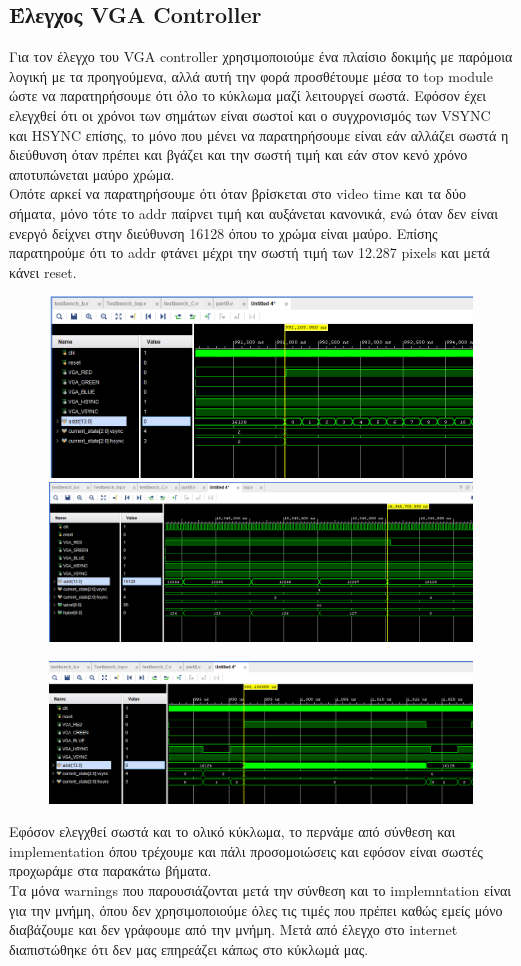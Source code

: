 \documentclass[12pt,a4paper]{article}
\begin{document}
	\subsection{Έλεγχος VGA Controller}
	Για τον έλεγχο του VGA controller χρησιμοποιούμε ένα πλαίσιο δοκιμής με παρόμοια λογική με τα προηγούμενα, αλλά αυτή την φορά προσθέτουμε μέσα το top module ώστε να παρατηρήσουμε ότι όλο το κύκλωμα μαζί λειτουργεί σωστά. Εφόσον έχει ελεγχθεί ότι οι χρόνοι των σημάτων είναι σωστοί και ο συγχρονισμός των VSYNC και HSYNC επίσης, το μόνο που μένει να παρατηρήσουμε είναι εάν αλλάζει σωστά η διεύθυνση όταν πρέπει και βγάζει και την σωστή τιμή και εάν στον κενό χρόνο αποτυπώνεται μαύρο χρώμα.\\
	Οπότε αρκεί να παρατηρήσουμε ότι όταν βρίσκεται στο video time και τα δύο σήματα, μόνο τότε το addr παίρνει τιμή και αυξάνεται κανονικά, ενώ όταν δεν είναι ενεργό δείχνει στην διεύθυνση 16128 όπου το χρώμα είναι μαύρο. Επίσης παρατηρούμε ότι το addr φτάνει μέχρι την σωστή τιμή των 12.287 pixels και μετά κάνει reset.
	\begin{figure}[H]
		\centering
		\includegraphics[width=.4\linewidth]{pictures/addr test}
		\centering
		\includegraphics[width=.4\linewidth]{pictures/final addr value}
	\end{figure}
	
	\begin{figure}[H]
		\centering
		\includegraphics[width=.6\linewidth]{pictures/addr full}
	\end{figure}
	Εφόσον ελεγχθεί σωστά και το ολικό κύκλωμα, το περνάμε από σύνθεση και implementation όπου τρέχουμε και πάλι προσομοιώσεις και εφόσον είναι σωστές προχωράμε στα παρακάτω βήματα.\\
	Τα μόνα warnings που παρουσιάζονται μετά την σύνθεση και το implemntation είναι για την μνήμη, όπου δεν χρησιμοποιούμε όλες τις τιμές που πρέπει καθώς εμείς μόνο διαβάζουμε και δεν γράφουμε από την μνήμη. Μετά από έλεγχο στο internet διαπιστώθηκε ότι δεν μας επηρεάζει κάπως στο κύκλωμά μας.
	
\end{document}
